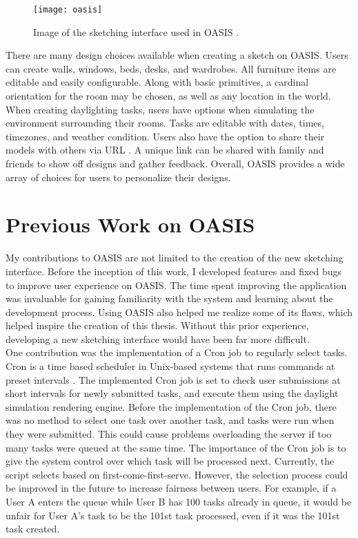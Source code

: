 \begin{figure}[ht]
\centering
\texttt{[image: oasis]}
\caption[Image of the sketching interface used in OASIS]{Image of the sketching interface used in OASIS \cite{oasis2016}.}
\label{fig:oasis}
\end{figure}

There are many design choices available when creating a sketch on OASIS. Users can create walls, windows, beds, desks, and wardrobes. All furniture items are editable and easily configurable. Along with basic primitives, a cardinal orientation for the room may be chosen, as well as any location in the world. When creating daylighting tasks, users have options when simulating the environment surrounding their rooms. Tasks are editable with dates, times, timezones, and weather condition. Users also have the option to share their models with others via URL \cite{oasis2016}. A unique link can be shared with family and friends to show off designs and gather feedback. Overall, OASIS provides a wide array of choices for users to personalize their designs.

\section{Previous Work on OASIS}

My contributions to OASIS are not limited to the creation of the new sketching interface. Before the inception of this work, I developed features and fixed bugs to improve user experience on OASIS. The time spent improving the application was invaluable for gaining familiarity with the system and learning about the development process. Using OASIS also helped me realize some of its flaws, which helped inspire the creation of this thesis. Without this prior experience, developing a new sketching interface would have been far more difficult. \\

One contribution was the implementation of a Cron job to regularly select tasks. Cron is a time based scheduler in Unix-based systems that runs commands at preset intervals \cite{cron}. The implemented Cron job is set to check user submissions at short intervals for newly submitted tasks, and execute them using the daylight simulation rendering engine. Before the implementation of the Cron job, there was no method to select one task over another task, and tasks were run when they were submitted. This could cause problems overloading the server if too many tasks were queued at the same time. The importance of the Cron job is to give the system control over which task will be processed next. Currently, the script selects based on first-come-first-serve. However, the selection process could be improved in the future to increase fairness between users. For example, if a User A enters the queue while User B has 100 tasks already in queue, it would be unfair for User A's task to be the 101st task processed, even if it was the 101st task created. \\

